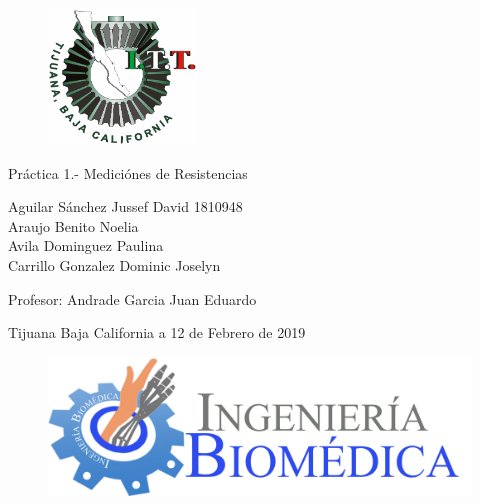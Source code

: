 \documentclass[11pt,a4paper]{report}
\begin{document}
	
	\begin{titlepage}
		
		\begin{center}
			\vspace*{-1in}
			\begin{figure}[t]
				\begin{flushleft}
					\includegraphics[width=4cm]{LOGO_ITT_2005}
					
				\end{flushleft}
			\end{figure}
		
			
				\begin{huge}
					\vspace*{3cm}
					Pr\'actica 1.- Medici\'ones de Resistencias\\
					\vspace*{3cm}
				\end{huge}
			\begin{Large}
			
			Aguilar S\'anchez Jussef David \hspace{3cm}1810948\\
			Araujo Benito Noelia\\
			Avila Dominguez Paulina\\
			Carrillo Gonzalez Dominic Joselyn\\
			
			
			\vspace*{4cm}
		
				Profesor: Andrade Garcia Juan Eduardo \\
			
			\vspace*{4cm}
			
				Tijuana Baja California a 12 de Febrero de 2019 \\
			\end{Large}
			
			\begin{figure}[b]
				\begin{flushright}
					\includegraphics[width=0.4\linewidth]{BIOMEDICA_HEADING1-2048x672}
					
					\label{fig:biomedicaheading1-2048x672}
				\end{flushright}
				
			\end{figure}
			
		
		\end{center}
		
	\end{titlepage}
	
\end{document}
